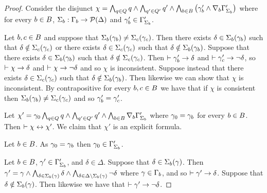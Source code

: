 \begin{proof}
Consider the disjunct $\chi = \bigwedge_{q \in Q} q \land \bigwedge_{q' \in Q'} q' \land \bigwedge_{b \in B} \left(\gamma'_b \land \nabla_{b} \Gamma'_{\Sigma_b} \right)$ where for every $b \in B$, $\Sigma_b : \Gamma_b \to \mathcal{P}(\Delta)$ and $\gamma'_b \in \Gamma'_{\Sigma_b}$.

Let $b, c \in B$ and suppose that $\Sigma_b(\gamma_b) \neq \Sigma_c(\gamma_c)$.
Then there exists $\delta \in \Sigma_b(\gamma_b)$ such that $\delta \notin \Sigma_c(\gamma_c)$ or
there exists $\delta \in \Sigma_c(\gamma_c)$ such that $\delta \notin \Sigma_b(\gamma_b)$.
Suppose that there exists $\delta \in \Sigma_b(\gamma_b)$ such that $\delta \notin \Sigma_c(\gamma_c)$.
Then $\vdash \gamma'_b \rightarrow \delta$ and $\vdash \gamma'_c \rightarrow \neg \delta$, so $\vdash \chi \rightarrow \delta$ and $\vdash \chi \rightarrow \neg \delta$ and so $\chi$ is inconsistent.
Suppose instead that there exists $\delta \in \Sigma_c(\gamma_c)$ such that $\delta \notin \Sigma_b(\gamma_b)$.
Then likewise we can show that $\chi$ is inconsistent.
By contrapositive for every $b, c \in B$ we have that if $\chi$ is consistent then $\Sigma_b(\gamma_b) \neq \Sigma_c(\gamma_c)$ and so $\gamma'_b = \gamma'_c$.

Let $\chi' = \gamma_0 \bigwedge_{q \in Q} q \land \bigwedge_{q' \in Q'} q' \land \bigwedge_{b \in B} \nabla_{b} \Gamma'_{\Sigma_b}$ where $\gamma_0 = \gamma_b$ for every $b \in B$.
Then $\vdash \chi \leftrightarrow \chi'$.
We claim that $\chi'$ is an explicit formula.

Let $b \in B$.
As $\gamma_0 = \gamma_b$ then $\gamma_0 \in \Gamma'_{\Sigma_b}$.

Let $b \in B$, $\gamma' \in \Gamma'_{\Sigma_b}$, and $\delta \in \Delta$.
Suppose that $\delta \in \Sigma_b(\gamma)$.
Then $\gamma' = \gamma \land \bigwedge_{\delta \in \Sigma_b(\gamma)} \delta \land \bigwedge_{\delta \in \Delta \setminus \Sigma_b(\gamma)} \neg \delta$  where $\gamma \in \Gamma_b$, and so $\vdash \gamma' \rightarrow \delta$.
Suppose that $\delta \notin \Sigma_b(\gamma)$.
Then likewise we have that $\vdash \gamma' \rightarrow \neg \delta$.


\end{proof}
